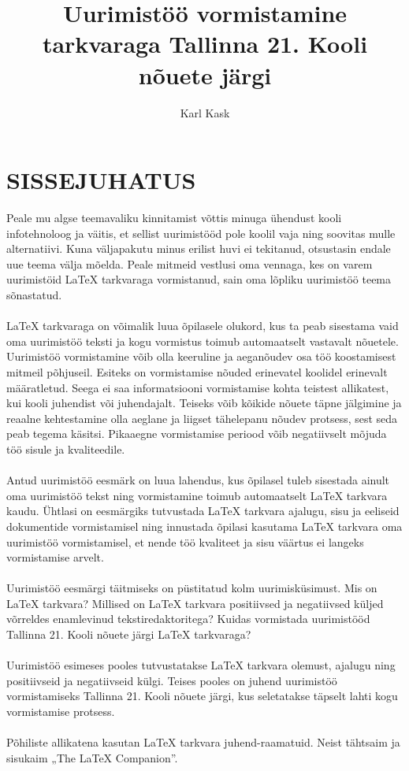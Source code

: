\documentclass{21kuur}
\title{Uurimistöö vormistamine \latex tarkvaraga Tallinna 21. Kooli nõuete järgi}
\author{Karl Kask}
\begin{document}
\maketitle
\makeannotation
\tableofcontents

\chapter*{SISSEJUHATUS}
Peale mu algse teemavaliku kinnitamist võttis minuga ühendust kooli infotehnoloog ja väitis, et sellist uurimistööd pole koolil vaja ning soovitas mulle alternatiivi. Kuna väljapakutu minus erilist huvi ei tekitanud, otsustasin endale uue teema välja mõelda. Peale mitmeid vestlusi oma vennaga, kes on varem uurimistöid LaTeX tarkvaraga vormistanud, sain oma lõpliku uurimistöö teema sõnastatud.
\\\\LaTeX tarkvaraga on võimalik luua õpilasele olukord, kus ta peab sisestama vaid oma uurimistöö teksti ja kogu vormistus toimub automaatselt vastavalt nõuetele. Uurimistöö vormistamine võib olla keeruline ja aeganõudev osa töö koostamisest mitmeil põhjuseil. Esiteks on vormistamise nõuded erinevatel koolidel erinevalt määratletud. Seega ei saa informatsiooni vormistamise kohta teistest allikatest, kui kooli juhendist või juhendajalt. Teiseks võib kõikide nõuete täpne jälgimine ja reaalne kehtestamine olla aeglane ja liigset tähelepanu nõudev protsess, sest seda peab tegema käsitsi. Pikaaegne vormistamise periood võib negatiivselt mõjuda töö sisule ja kvaliteedile.
\\\\Antud uurimistöö eesmärk on luua lahendus, kus õpilasel tuleb sisestada ainult oma uurimistöö tekst ning vormistamine toimub automaatselt LaTeX tarkvara kaudu. Ühtlasi on eesmärgiks tutvustada LaTeX tarkvara ajalugu, sisu ja eeliseid dokumentide vormistamisel ning innustada õpilasi kasutama LaTeX tarkvara oma uurimistöö vormistamisel, et nende töö kvaliteet ja sisu väärtus ei langeks vormistamise arvelt. 
\\\\Uurimistöö eesmärgi täitmiseks on püstitatud kolm uurimisküsimust. Mis on LaTeX tarkvara? Millised on LaTeX tarkvara positiivsed ja negatiivsed küljed võrreldes enamlevinud tekstiredaktoritega? Kuidas vormistada uurimistööd Tallinna 21. Kooli nõuete järgi LaTeX tarkvaraga?
\\\\Uurimistöö esimeses pooles tutvustatakse LaTeX tarkvara olemust, ajalugu ning positiivseid ja negatiivseid külgi. Teises pooles on juhend uurimistöö vormistamiseks Tallinna 21. Kooli nõuete järgi, kus seletatakse täpselt lahti kogu vormistamise protsess.
\\\\Põhiliste allikatena kasutan LaTeX tarkvara juhend-raamatuid. Neist tähtsaim ja sisukaim „The LaTeX Companion”.
\end{document}
